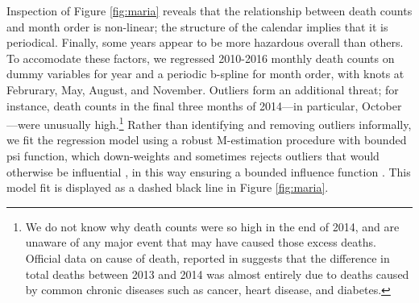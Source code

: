 Inspection of Figure \ref{fig:maria} reveals that the relationship
between death counts and month order is non-linear; the structure of
the calendar implies that it is periodical.
Finally, some years appear to be more hazardous overall than others.
To accomodate these factors, we regressed 2010-2016 monthly death counts
on dummy variables for year and a periodic b-spline for month order,
with knots at Februrary, May, August, and November.
Outliers form an additional threat; for instance, death
counts in the final three months of 2014---in particular,
October---were unusually high.\footnote{We do not know why death
  counts were so high in the end of 2014, and are unaware of any
  major event that may have caused those excess deaths. Official data
  on cause of death, reported in \citet[][p. 44]{PRsalud} suggests
  that the difference in total deaths between 2013 and 2014 was almost
  entirely due to deaths caused by common chronic diseases such as
  cancer, heart disease, and diabetes.}
Rather than identifying and removing outliers informally, we fit the regression model
using a robust M-estimation procedure with bounded psi function, which
down-weights and sometimes rejects outliers that would otherwise be
influential \citep{maronna2006robust}%
, in this way ensuring a bounded influence function \citep{yohaiZamar1997locallyrobustMestimates}.
This model fit is displayed as a dashed black line in Figure
\ref{fig:maria}.

